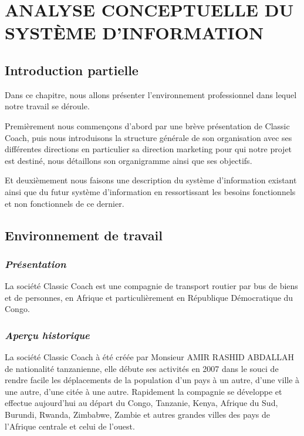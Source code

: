 \chapter[ANALYSE CONCEPTUELLE DU SYSTÈME D’INFORMATION]{ANALYSE CONCEPTUELLE DU SYSTÈME D’INFORMATION}
    \section[Introduction partielle]{Introduction partielle}
    Dans ce chapitre, nous allons présenter l’environnement professionnel dans lequel notre
    travail se déroule.
    \par
    Premièrement nous commençons d’abord par une brève présentation de Classic Coach, puis nous introduisons
    la structure générale de son organisation avec ses différentes directions en particulier
    sa direction marketing pour qui notre projet est destiné, nous détaillons son organigramme ainsi
    que ses objectifs. 
    \par
    Et deuxièmement nous faisons une description du système d’information existant ainsi
    que du futur système d’information en ressortissant les besoins fonctionnels et non
    fonctionnels de ce dernier.
    \section[Environnement de travail]{Environnement de travail}
        \subsection[Présentation]{\textit{Présentation}}
        La société Classic Coach est une compagnie de transport routier
        par bus de biens et de personnes, en Afrique et particulièrement
        en République Démocratique du Congo.

        \subsection[Aperçu historique]{\textit{Aperçu historique}}
        La société Classic Coach à été créée par Monsieur AMIR RASHID ABDALLAH
        de nationalité tanzanienne, elle débute ses activités en 2007 dans le
        souci de rendre facile les déplacements de la population d’un pays à un autre, d’une ville à une autre,
        d’une citée à une autre. Rapidement la compagnie se développe et effectue
        aujourd’hui au départ du Congo, Tanzanie, Kenya, Afrique du Sud, Burundi,
        Rwanda, Zimbabwe, Zambie et autres grandes villes des pays de l’Afrique
        centrale et celui de l’ouest. 

